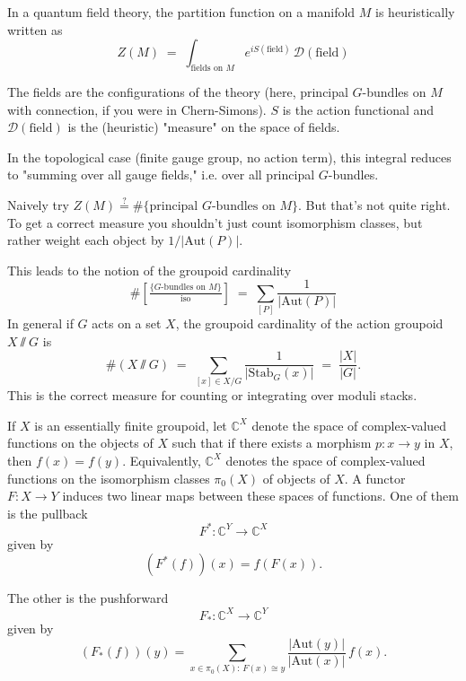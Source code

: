 \documentclass[12pt]{article}
\begin{document}
\begin{remark}
    In a quantum field theory, the partition function on a manifold $M$ is heuristically written as
    \[Z(M) \;=\; \int_{\text{fields on }M} e^{iS(\text{field})}\, \mathcal{D}(\text{field})\]

    The fields are the configurations of the theory (here, principal $G$-bundles on $M$ with connection, if you were in Chern-Simons).
    $S$ is the action functional and $\mathcal{D}(\text{field})$ is the (heuristic) "measure" on the space of fields.

    In the topological case (finite gauge group, no action term), this integral reduces to "summing over all gauge fields," i.e. over all principal $G$-bundles.
\end{remark}

\begin{remark}
    Naively try $Z(M) \stackrel{?}{=} \#\{\text{principal $G$-bundles on $M$}\}$.
    But that's not quite right. To get a correct measure you shouldn't just count isomorphism classes, but rather weight each object by $1/|\mathrm{Aut}(P)|$.

    This leads to the notion of the groupoid cardinality
    \[\#\!\!\left[\tfrac{\{\text{$G$-bundles on $M$}\}}{\text{iso}}\right]
        \;=\; \sum_{[P]} \frac{1}{|\mathrm{Aut}(P)|}\]
    In general if $G$ acts on a set $X$, the groupoid cardinality of the action groupoid $X\sslash G$ is
    \[\#(X\sslash G) \;=\; \sum_{[x]\in X/G} \frac{1}{|\mathrm{Stab}_G(x)|} \;=\; \frac{|X|}{|G|}.\]
    This is the correct measure for counting or integrating over moduli stacks. 
\end{remark}

If $X$ is an essentially finite groupoid, let $\mathbb{C}^X$ denote the space of complex-valued functions on the objects of $X$ such that if there exists a morphism $p : x \to y$ in $X$, then $f(x)=f(y)$. Equivalently, $\mathbb{C}^X$ denotes the space of complex-valued functions on the isomorphism classes $\pi_0(X)$ of objects of $X$. A functor $F : X \to Y$ induces two linear maps between these spaces of functions. One of them is the pullback
\[
    F^* : \mathbb{C}^Y \to \mathbb{C}^X
\]
given by
\[
    (F^*(f))(x) = f(F(x)).
\]

The other is the pushforward
\[
    F_* : \mathbb{C}^X \to \mathbb{C}^Y
\]
given by
\[
    (F_*(f))(y) = \sum_{x \in \pi_0(X):\,F(x)\cong y} \frac{|\mathrm{Aut}(y)|}{|\mathrm{Aut}(x)|}\, f(x).
\]
\end{document}
